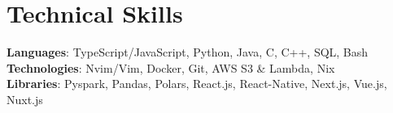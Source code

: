 \section{Technical Skills}
\begin{itemize}[leftmargin=0.15in, label={}]
	\small{\item{
	      \textbf{Languages}{: TypeScript/JavaScript, Python, Java, C, C++, SQL, Bash } \\
        \textbf{Technologies}{: Nvim/Vim, Docker, Git, AWS S3 \& Lambda, Nix } \\
        \textbf{Libraries}{: Pyspark, Pandas, Polars, React.js, React-Native, Next.js, Vue.js, Nuxt.js}}}
\end{itemize}
